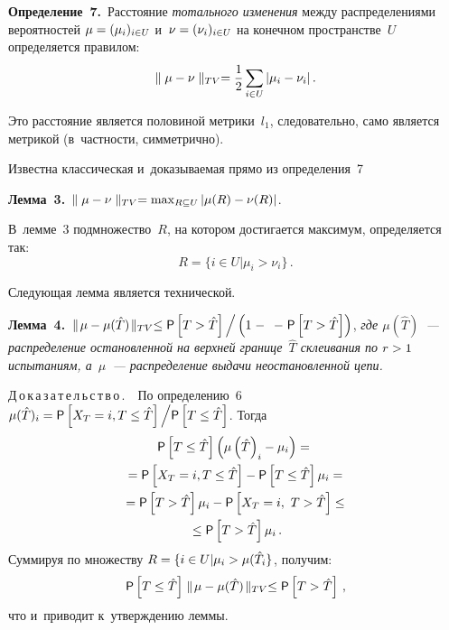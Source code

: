 \begin{multicols}{2}
\smallskip

\noindent
\textbf{Определение~7.}\ Расстояние \textit{тотального изменения} между 
распределениями вероятностей $\mu\hm= (\mu_i)_{i\in U}$ и~$\nu\hm= 
(\nu_i)_{i\in U}$ на конечном пространстве~$U$ определяется правилом: 
$$
\parallel \mu-\nu\parallel_{TV} =\displaystyle\frac{\displaystyle 1\mathstrut}{\displaystyle 2\mathstrut}\sum\limits_{i\in U} \vert \mu_i -
\nu_i\vert\,.
$$

    Это расстояние является половиной метрики~$l_1$, следовательно, само 
является метрикой (в~част\-ности, симметрично).
    
    \smallskip
    
    Известна классическая и~доказываемая прямо из определения~7 
    
    \smallskip
    
    \noindent
     \textbf{Лемма~3.}\ $\parallel \mu - \nu\parallel_{TV}\hm=\max\nolimits_{R\subseteq U} 
\vert \mu(R)\hm- \nu(R)\vert$.
     
     \smallskip
      
    В~лемме~3 подмножество~$R$, на котором достигается максимум, 
определяется так: $$
R= \{ i\in U\vert \mu_i>\nu_i\}\,.
$$
    
    Следующая лемма является технической.
    
    \smallskip
    
    \noindent
    \textbf{Лемма~4.}\ $\parallel\! \mu - \mu(\hat{T})\!\parallel_{TV}\hm\leq 
{\sf P}\left[T>\hat{T}\right]\Big/\left(\vphantom{\hat{T}}1\;-\right.\linebreak$ 
$\left.-\;{\sf P}\left[T>\hat{T}\right]\right)$, \textit{где $\mu(\hat{T})$~--- распределение 
останов\-лен\-ной на верхней границе~$\hat{T}$ склеивания по $r\hm>1$ 
испытаниям, а~$\mu$~--- распределение выдачи не\-останов\-лен\-ной цепи.}
    \smallskip
    
    \noindent
    Д\,о\,к\,а\,з\,а\,т\,е\,л\,ь\,с\,т\,в\,о\,.\ \  По определению~6 
$\mu(\hat{T})_i\hm= {\sf P}\left[X_T=i, T\leq \hat{T}\right]\Big/{\sf P}\left[T\leq \hat{T}\right]$. Тогда
    \begin{multline*}
    {\sf P}\left[ T\leq \hat{T}\right]\left( \mu\left( \hat{T}\right)_i-
    \mu_i\right) ={}\\
    {}=
    {\sf P}\left[ X_T=i, T\leq \hat{T}\right] -{\sf P}
    \left[ T\leq \hat{T}\right] \mu_i={}\\
    {}=
{\sf  P}\left[ T>\hat{T}\right] \mu_i - {\sf P}\left[ X_T=i,\ T>\hat{T}\right] \leq{}\\
    {}\leq {\sf P}\left[ 
T>\hat{T}\right] \mu_i\,.
    \end{multline*}
        Суммируя по множеству $R\hm= \{i\in U \vert \mu_i> \mu(\hat{T}_i\}$, 
получим: 
    $$
    {\sf P}\left[ T\leq \hat{T}\right] \parallel\! \mu-\mu(\hat{T})\!\parallel_{TV} \leq 
{\sf P}\left[ T>\hat{T}\right]\,,
    $$
    что и~приводит к~утверждению леммы.
    

\end{multicols}
